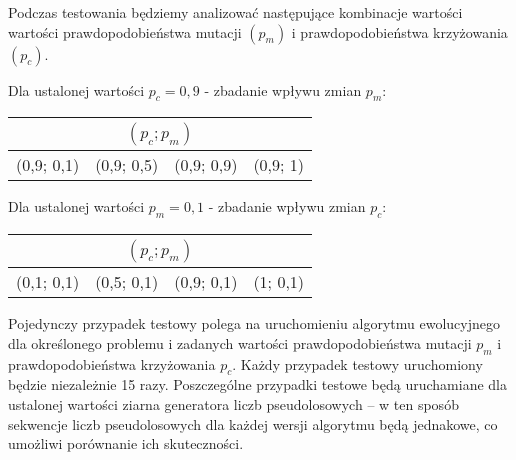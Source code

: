 \documentclass[12pt, a4paper]{article}
\begin{document}
Podczas testowania będziemy analizować następujące kombinacje wartości wartości prawdopodobieństwa mutacji $(p_m)$ i prawdopodobieństwa krzyżowania $(p_c)$.

\bigskip

Dla ustalonej wartości $p_c = 0,9$ - zbadanie wpływu zmian $p_m$:
\begin{center}
\begin{tabular}{|l|l|l|l|}
\hline
\multicolumn{4}{|c|}{$(p_c; p_m)$} \\
\hline
(0,9; 0,1) & (0,9; 0,5) & (0,9; 0,9) & (0,9; 1)\\
\hline
\end{tabular}
\end{center}

\bigskip

Dla ustalonej wartości $p_m = 0,1$ - zbadanie wpływu zmian $p_c$:
\begin{center}
\begin{tabular}{|l|l|l|l|}
\hline
\multicolumn{4}{|c|}{$(p_c; p_m)$} \\
\hline
(0,1; 0,1) & (0,5; 0,1) & (0,9; 0,1) & (1; 0,1)\\
\hline
\end{tabular}
\end{center}

\bigskip
Pojedynczy przypadek testowy polega na uruchomieniu algorytmu ewolucyjnego dla określonego problemu i zadanych wartości 
prawdopodobieństwa mutacji $p_m$ i prawdopodobieństwa krzyżowania $p_c$.
Każdy przypadek testowy uruchomiony będzie niezależnie 15 razy. Poszczególne przypadki testowe będą uruchamiane dla ustalonej 
wartości ziarna generatora liczb pseudolosowych -- w ten sposób sekwencje liczb pseudolosowych dla każdej wersji 
algorytmu będą jednakowe, co umożliwi porównanie ich skuteczności.
 
\nocite{*}


\end{document}
